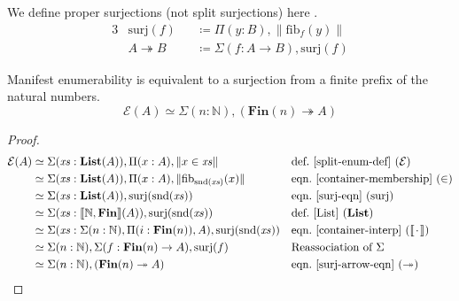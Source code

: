 \begin{definition}[Surjections] \label{surjections}
  We define proper surjections (not split surjections) here \cite[definition
  4.6.1]{hottbook}.
  \begin{alignat}{3}
    &\text{surj}(f)             &&\coloneqq \Pi(y : B) , \lVert \text{fib}_f(y) \rVert \label{surj-eqn} \\
    &A \twoheadrightarrow B     &&\coloneqq \Sigma (f : A \rightarrow B) , \text{surj}(f) \label{surj-arrow-eqn}
  \end{alignat}
\end{definition}
\begin{lemma}
  Manifest enumerability is equivalent to a surjection from a finite prefix of
  the natural numbers.
  \begin{equation}
    \mathcal{E}(A) \simeq \Sigma(n : \mathbb{N}) , (\mathbf{Fin}(n) \twoheadrightarrow A)
  \end{equation}
\end{lemma}
\begin{proof}
  \begin{align*}
     \mathcal{E}(A) &
    \simeq \Sigma (\mathit{xs} : \textbf{List}(A)) , \Pi {(x : A)} , \lVert x \in \mathit{xs} \rVert
    && \text{def.~\ref{split-enum-def} }(\mathcal{E})
    \\
    & \simeq \Sigma (\mathit{xs} : \textbf{List}(A)) , \Pi {(x : A)} , \lVert \text{fib}_{\text{snd}(\mathit{xs})}(x) \rVert
    && \text{eqn.~\ref{container-membership} } (\in)
    \\
    & \simeq \Sigma (\mathit{xs} : \textbf{List}(A)) , \text{surj}(\text{snd}(\mathit{xs}))
    && \text{eqn.~\ref{surj-eqn} (surj)}
    \\
    & \simeq \Sigma (\mathit{xs} : \llbracket \mathbb{N} , \mathbf{Fin} \rrbracket (A)) , \text{surj}(\text{snd}(\mathit{xs}))
    && \text{def.~\ref{List} } (\mathbf{List})
    \\
    & \simeq \Sigma (\mathit{xs} : \Sigma (n : \mathbb{N}) , \Pi (i : \mathbf{Fin}(n)) , A) , \text{surj}(\text{snd}(\mathit{xs}))
    && \text{eqn.~\ref{container-interp} } (\llbracket {\mkern2mu\cdot\mkern2mu} \rrbracket)
    \\
    & \simeq \Sigma (n : \mathbb{N}) , \Sigma (f : \mathbf{Fin}(n) \rightarrow A) , \text{surj}(f)
    && \text{Reassociation of } \Sigma
    \\
    & \simeq \Sigma (n : \mathbb{N}) , ( \mathbf{Fin}(n) \twoheadrightarrow A )
    && \text{eqn.~\ref{surj-arrow-eqn} } (\twoheadrightarrow) \; \qedhere
  \end{align*}
\end{proof}
